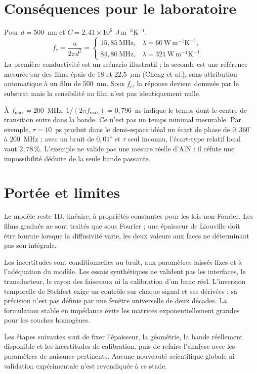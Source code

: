 \documentclass[11pt,a4paper]{article}
\begin{document}
\section{Conséquences pour le laboratoire}
Pour $d=500$~nm et $C=2{,}41\times10^6$~J\,m$^{-3}$K$^{-1}$,
\[
f_c=\frac{a}{2\pi d^2}
=\begin{cases}
15{,}85~\mathrm{MHz},&\lambda=60~\mathrm{W\,m^{-1}K^{-1}},\\
84{,}80~\mathrm{MHz},&\lambda=321~\mathrm{W\,m^{-1}K^{-1}}.
\end{cases}
\]
La première conductivité est un scénario illustratif ; la seconde est une
référence mesurée sur des films épais de 18 et 22,5~$\mu$m (Cheng et al.),
sans attribution automatique à un film de 500~nm.
Sous $f_c$, la réponse devient dominée par le substrat mais la sensibilité au
film n'est pas identiquement nulle.

À $f_{\max}=200$~MHz, $1/(2\pi f_{\max})=0{,}796$~ns indique le temps dont
le centre de transition entre dans la bande. Ce n'est pas un temps minimal
mesurable. Par exemple, $\tau=10$~ps produit dans le demi-espace idéal un
écart de phase de $0{,}360^\circ$ à 200~MHz ; avec un bruit de $0{,}01^\circ$
et $\tau$ seul inconnu, l'écart-type relatif local vaut $2{,}78\,\%$.
L'exemple ne valide pas une mesure réelle d'AlN : il réfute une impossibilité
déduite de la seule bande passante.

\section{Portée et limites}
Le modèle reste 1D, linéaire, à propriétés constantes pour les lois non-Fourier.
Les films gradués ne sont traités que sous Fourier ; une épaisseur de Liouville
doit être fournie lorsque la diffusivité varie, les deux valeurs aux faces ne
déterminant pas son intégrale.

Les incertitudes sont conditionnelles au bruit, aux paramètres laissés fixes
et à l'adéquation du modèle. Les essais synthétiques ne valident pas les
interfaces, le transducteur, le rayon des faisceaux ni la calibration d'un banc réel.
L'inversion temporelle de Stehfest exige un contrôle sur chaque signal et ses
dérivées ; sa précision n'est pas définie par une fenêtre universelle de deux décades.
La formulation stable en impédance évite les matrices exponentiellement grandes
pour les couches homogènes.

Les étapes suivantes sont de fixer l'épaisseur, la géométrie, la bande réellement
disponible et les incertitudes de calibration, puis de refaire l'analyse avec
les paramètres de nuisance pertinents. Aucune nouveauté scientifique globale
ni validation expérimentale n'est revendiquée à ce stade.
\end{document}
